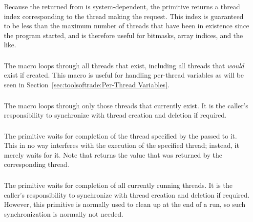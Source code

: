 \subsubsection{}

Because the  returned from  is
system-dependent, the  primitive returns a thread
index corresponding to the thread making the request.
This index is guaranteed to be less than the maximum number of threads
that have been in existence since the program started,
and is therefore useful for bitmasks, array indices, and
the like.

\subsubsection{}

The  macro loops through all threads that exist,
including all threads that \emph{would} exist if created.
This macro is useful for handling per-thread variables as will be
seen in Section~\ref{sec:toolsoftrade:Per-Thread Variables}.

\subsubsection{}

The 
macro loops through only those threads that currently exist.
It is the caller's responsibility to synchronize with thread
creation and deletion if required.

\subsubsection{}

The  primitive waits for completion of the thread
specified by the  passed to it.
This in no way interferes with the execution of the specified thread;
instead, it merely waits for it.
Note that  returns the value that was returned by
the corresponding thread.

\subsubsection{}

The 
primitive waits for completion of all currently running threads.
It is the caller's responsibility to synchronize with thread creation
and deletion if required.
However, this primitive is normally used to clean up at the end of
a run, so such synchronization is normally not needed.

